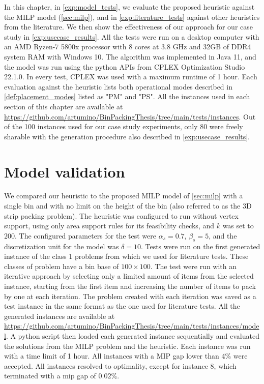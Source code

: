 In this chapter, in \cref{exp:model_tests}, we evaluate the proposed heuristic against the MILP model (\ref{sec:milp}), and in \cref{exp:literature_tests} against other heuristics from the literature. We then show the effectiveness of our approach for our case study in \cref{exp:usecase_results}.
All the tests were run on a desktop computer with an AMD Ryzen-7 5800x processor with 8 cores at 3.8 GHz and 32GB of DDR4 system RAM with Windows 10. The algorithm was implemented in Java 11, and the model was run using the python APIs from CPLEX Optimization Studio 22.1.0.
In every test, CPLEX was used with a maximum runtime of 1 hour.
Each evaluation against the heuristic lists both operational modes described in \cref{def:placement_modes} listed as "PM" and "PS".
All the instances used in each section of this chapter are available at \url{https://github.com/artumino/BinPackingThesis/tree/main/tests/instances}.
Out of the 100 instances used for our case study experiments, only 80 were freely sharable with the generation procedure also described in \cref{exp:usecase_results}.

\section{Model validation}
We compared our heuristic to the proposed MILP model of \cref{sec:milp} with a single bin and with no limit on the height of the bin (also referred to as the 3D strip packing problem).
The heuristic was configured to run without vertex support, using only area support rules for its feasibility checks, and $k$ was set to $200$.
The configured parameters for the test were $\alpha_s = 0.7$, $\beta_s = 5$, and the discretization unit for the model was $\delta = 10$.
Tests were run on the first generated instance of the class 1 problems from \citep{martello2000three} which we used for literature tests. These classes of problem have a bin base of $100 \times 100$.
The test were run with an iterative approach by selecting only a limited amount of items from the selected instance, starting from the first item and increasing the number of items to pack by one at each iteration.
The problem created with each iteration was saved as a test instance in the same format as the one used for literature tests.
All the generated instances are available at \url{https://github.com/artumino/BinPackingThesis/tree/main/tests/instances/model}.
A python script then loaded each generated instance sequentially and evaluated the solutions from the MILP problem and the heuristic.
Each instance was run with a time limit of 1 hour. All instances with a MIP gap lower than $4\%$ were accepted.
All instances resolved to optimality, except for instance 8, which terminated with a mip gap of $0.02\%$.

